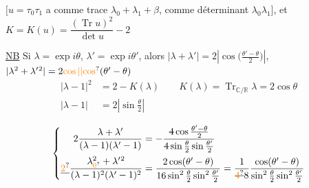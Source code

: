 $[u=\tau_0\tau_1$ a comme trace $\lambda_0+\lambda_1+\beta$, comme déterminant $\lambda_0\lambda_1]$, et $K=K(u)=\dfrac{(\operatorname{Tr}u)^2}{\det u}-2$

\uline{NB} Si $\lambda=\exp i\theta$, $\lambda'=\exp i\theta'$, alors $\lvert\lambda+\lambda'\rvert=2\left|\cos\bigl(\frac{\theta'-\theta}{2}\bigr)\right|$, $\lvert\lambda^2+\lambda'{}^2\rvert=2\unsure{\cos|\lvert\cos}(\theta'-\theta)$
\[
\begin{aligned}
|\lambda-1|^2&=2-K(\lambda)\qquad K(\lambda)=\operatorname{Tr}_{\mathbb C/\mathbb R}\lambda=2\cos\theta\\
|\lambda-1|&=2\left|\sin\frac{\theta}{2}\right|
\end{aligned}
\]

\[
\left\{\begin{aligned}
2\frac{\lambda+\lambda'}{(\lambda-1)(\lambda'-1)}
&=-\frac{\deleted{4}\cos\frac{\theta'-\theta}{2}}{\deleted{4}\sin\frac\theta2\sin\frac{\theta'}2}\\
\deleted{\unsure{2}}\frac{\lambda_{\unsure{0}}^2+\lambda'{}^2}{(\lambda-1)^2(\lambda'-1)^2}
&=\frac{2\cos(\theta'-\theta)}{16\sin^2\frac\theta2\sin^2\frac{\theta'}2}
=\frac{1}{\deleted{\unsure{4}}8}\frac{\cos(\theta'-\theta)}{\sin^2\frac\theta2\sin^2\frac{\theta'}2}
\end{aligned}\right.
\]

